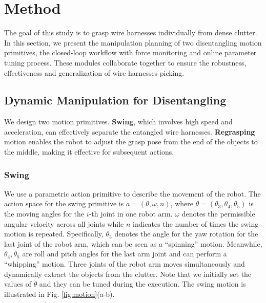\documentclass[letterpaper, 10 pt, conference]{ieeeconf}
\begin{document}
\section{Method}

    The goal of this study is to grasp wire harnesses individually from dense clutter. In this section, we present the manipulation planning of two disentangling motion primitives, the closed-loop workflow with force monitoring and online parameter tuning process. These modules collaborate together to ensure the robustness, effectiveness and generalization of wire harnesses picking. 


\subsection{Dynamic Manipulation for Disentangling}

    We design two motion primitives. \textbf{Swing}, which involves high speed and acceleration, can effectively separate the entangled wire harnesses. \textbf{Regrasping} motion enables the robot to adjust the grasp pose from the end of the objects to the middle, making it effective for subsequent actions. 
    
\subsubsection{Swing}
    We use a parametric action primitive to describe the movement of the robot. The action space for the swing primitive is $a=(\theta,\omega,n)$, where $\theta=(\theta_3,\theta_4,\theta_5)$ is the moving angles for the $i$-th joint in one robot arm. $\omega$ denotes the permissible angular velocity across all joints while $n$ indicates the number of times the swing motion is repeated. Specifically, $\theta_5$ denotes the angle for the yaw rotation for the last joint of the robot arm, which can be seen as a ``spinning'' motion. Meanwhile, $\theta_4,\theta_5$ are roll and pitch angles for the last arm joint and can perform a ``whipping'' motion. Three joints of the robot arm moves simultaneously and dynamically extract the objects from the clutter. Note that we initially set the values of $\theta$ and they can be tuned during the execution. The swing motion is illustrated in Fig. \ref{fig:motion}(a-b). 
\end{document}
